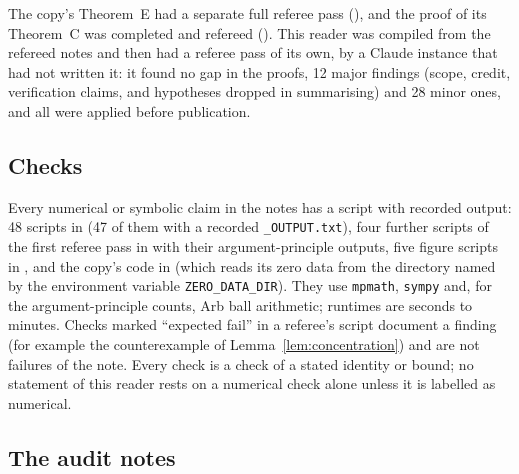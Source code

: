 The copy's Theorem~E had a separate full referee pass (), and the proof of its Theorem~C was completed and refereed (). This reader was compiled from the refereed notes and then had a referee pass of its own, by a Claude instance that had not written it: it found no gap in the proofs, 12 major findings (scope, credit, verification claims, and hypotheses dropped in summarising) and 28 minor ones, and all were applied before publication.

\subsection{Checks}

Every numerical or symbolic claim in the notes has a script with recorded output: 48 scripts in  (47 of them with a recorded \texttt{\_OUTPUT.txt}), four further scripts of the first referee pass in  with their argument-principle outputs, five figure scripts in , and the copy's code in  (which reads its zero data from the directory named by the environment variable \texttt{ZERO\_DATA\_DIR}). They use \texttt{mpmath}, \texttt{sympy} and, for the argument-principle counts, Arb ball arithmetic; runtimes are seconds to minutes. Checks marked ``expected fail'' in a referee's script document a finding (for example the counterexample of Lemma~\ref{lem:concentration}) and are not failures of the note. Every check is a check of a stated identity or bound; no statement of this reader rests on a numerical check alone unless it is labelled as numerical.

\subsection{The audit notes}

